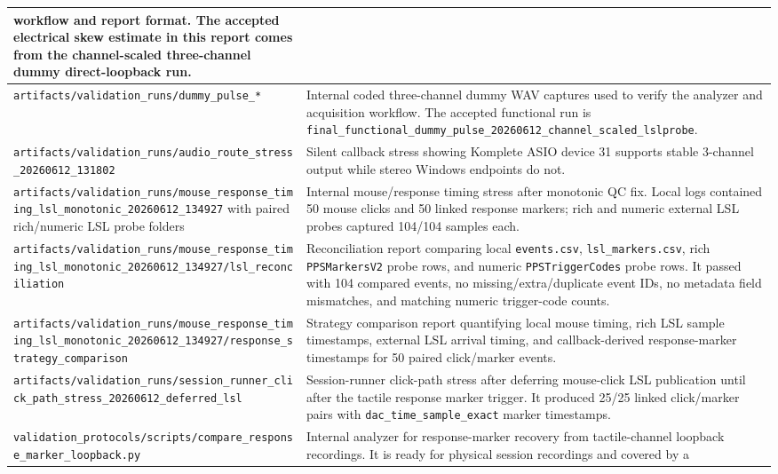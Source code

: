 \documentclass[11pt]{article}
\begin{document}
\begin{longtable}{|p{}|p{}|}
workflow and report format. The accepted electrical skew estimate in this
report comes from the channel-scaled three-channel dummy direct-loopback run. \\
\hline
\texttt{artifacts/validation\_runs/dummy\_pulse\_*}
& Internal coded three-channel dummy WAV captures used to verify the analyzer
and acquisition workflow. The accepted functional run is
\texttt{final\_functional\_dummy\_pulse\_20260612\_channel\_scaled\_lslprobe}. \\
\hline
\texttt{artifacts/validation\_runs/audio\_route\_stress\_20260612\_131802} &
Silent callback stress showing Komplete ASIO device 31 supports stable
3-channel output while stereo Windows endpoints do not. \\
\hline
\texttt{artifacts/validation\_runs/mouse\_response\_timing\_lsl\_monotonic\_20260612\_134927}
with paired rich/numeric LSL probe folders & Internal mouse/response timing
stress after monotonic QC fix. Local logs contained 50 mouse clicks and 50
linked response markers; rich and numeric external LSL probes captured 104/104
samples each. \\
\hline
\texttt{artifacts/validation\_runs/mouse\_response\_timing\_lsl\_monotonic\_20260612\_134927/lsl\_reconciliation}
& Reconciliation report comparing local \texttt{events.csv},
\texttt{lsl\_markers.csv}, rich \texttt{PPSMarkersV2} probe rows, and numeric
\texttt{PPSTriggerCodes} probe rows. It passed with 104 compared events, no
missing/extra/duplicate event IDs, no metadata field mismatches, and matching
numeric trigger-code counts. \\
\hline
\texttt{artifacts/validation\_runs/mouse\_response\_timing\_lsl\_monotonic\_20260612\_134927/response\_strategy\_comparison}
& Strategy comparison report quantifying local mouse timing, rich LSL sample
timestamps, external LSL arrival timing, and callback-derived response-marker
timestamps for 50 paired click/marker events. \\
\hline
\texttt{artifacts/validation\_runs/session\_runner\_click\_path\_stress\_20260612\_deferred\_lsl}
& Session-runner click-path stress after deferring mouse-click LSL publication
until after the tactile response marker trigger. It produced 25/25 linked
click/marker pairs with \texttt{dac\_time\_sample\_exact} marker timestamps. \\
\hline
\texttt{validation\_protocols/scripts/compare\_response\_marker\_loopback.py}
& Internal analyzer for response-marker recovery from tactile-channel loopback
recordings. It is ready for physical session recordings and covered by a

\end{longtable}
\end{document}
